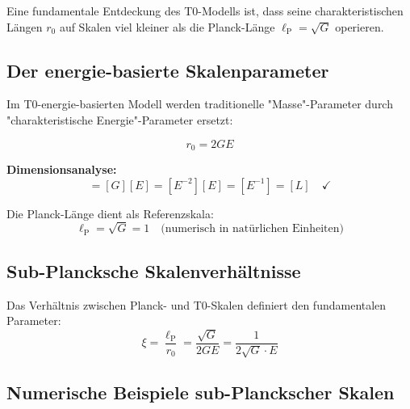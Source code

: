 \documentclass[12pt,a4paper]{report}
\newcommand{\lP}{\ell_{\text{P}}}         %
\newcommand{\rzero}{r_0}                  %
\begin{document}
	Eine fundamentale Entdeckung des T0-Modells ist, dass seine charakteristischen Längen $\rzero$ auf Skalen viel kleiner als die Planck-Länge $\lP = \sqrt{G}$ operieren.
	
	\subsection{Der energie-basierte Skalenparameter}
	\label{subsec:energy_based_scale_parameter}
	
	Im T0-energie-basierten Modell werden traditionelle "Masse"-Parameter durch "charakteristische Energie"-Parameter ersetzt:
	
	\begin{equation}
		\boxed{\rzero = 2GE}
		\label{eq:fundamental_r0}
	\end{equation}
	
	\textbf{Dimensionsanalyse:}
	\begin{equation}
		[\rzero] = [G][E] = [E^{-2}][E] = [E^{-1}] = [L] \quad \checkmark
	\end{equation}
	
	Die Planck-Länge dient als Referenzskala:
	\begin{equation}
		\lP = \sqrt{G} = 1 \quad \text{(numerisch in natürlichen Einheiten)}
	\end{equation}
	
	\subsection{Sub-Plancksche Skalenverhältnisse}
	\label{subsec:sub_planckian_ratios}
	
	Das Verhältnis zwischen Planck- und T0-Skalen definiert den fundamentalen Parameter:
	\begin{equation}
		\xi = \frac{\lP}{\rzero} = \frac{\sqrt{G}}{2GE} = \frac{1}{2\sqrt{G} \cdot E}
	\end{equation}
	
	\subsection{Numerische Beispiele sub-Planckscher Skalen}
	\label{subsec:numerical_sub_planckian}
	
\end{document}
